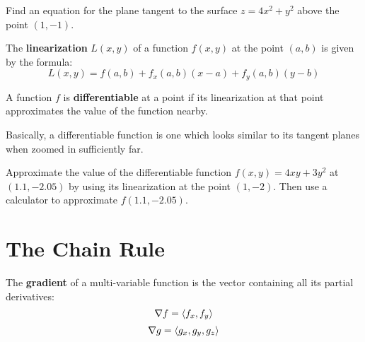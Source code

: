 \documentclass[letterpaper, twoside, 12pt]{book}
\begin{document}
          \begin{solution}

          \end{solution}

          \begin{problem}
            Find an equation for the plane tangent to the surface
            $z=4x^2+y^2$ above the point $(1,-1)$.
          \end{problem}

          \begin{solution}

          \end{solution}

\begin{definition}
  The \textbf{linearization} $L(x,y)$ of a function $f(x,y)$
  at the point $(a,b)$ is given by the formula:
  \[
    L(x,y) = f(a,b)+f_x(a,b)(x-a)+f_y(a,b)(y-b)
  \]
\end{definition}

\begin{definition}
  A function $f$ is \textbf{differentiable} at a point if its linearization
  at that point approximates the value of the function nearby.
\end{definition}

\begin{remark}
  Basically, a differentiable function is one which looks similar to
  its tangent planes when zoomed in sufficiently far.
\end{remark}

          \begin{problem}
            Approximate the value of the differentiable function
            $f(x,y)=4xy+3y^2$ at $(1.1,-2.05)$ by using its linearization
            at the point $(1,-2)$.
            Then use a calculator to approximate $f(1.1,-2.05)$.
          \end{problem}

          \begin{solution}

          \end{solution}


\section{The Chain Rule}%

\begin{definition}
  The \textbf{gradient} of a multi-variable function is the vector containing
  all its partial derivatives:
    \[
      \nabla f = \langle f_x,f_y\rangle
    \]
    \[
      \nabla g = \langle g_x,g_y,g_z\rangle
    \]
\end{definition}
\end{document}
